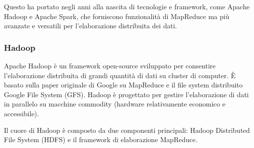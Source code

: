 Questo ha portato negli anni alla nascita di tecnologie e framework, come Apache Hadoop e Apache Spark, che forniscono funzionalità di MapReduce ma più avanzate e versatili per l'elaborazione distribuita dei dati.

\subsubsection{Hadoop}
Apache Hadoop è un framework open-source sviluppato per consentire l'elaborazione distribuita di grandi quantità di dati su cluster di computer. È basato sulla paper originale di Google su MapReduce e il file system distribuito Google File System (GFS). Hadoop è progettato per gestire l'elaborazione di dati in parallelo su macchine commodity (hardware relativamente economico e accessibile).

Il cuore di Hadoop\cite{ApacheHadoopSite} è composto da due componenti principali: Hadoop Distributed File System (HDFS) e il framework di elaborazione MapReduce.

